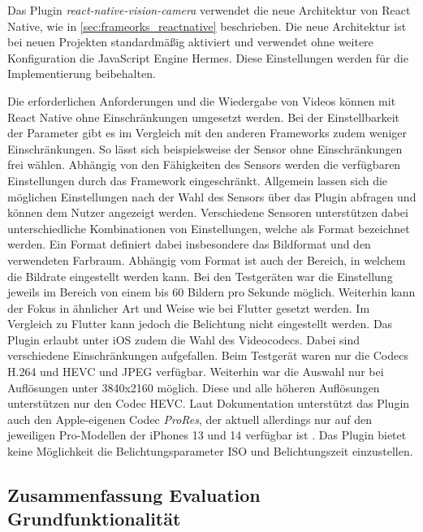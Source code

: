 Das Plugin \textit{react-native-vision-camera} verwendet die neue Architektur von React Native, wie in \autoref{sec:frameorks_reactnative} beschrieben.
Die neue Architektur ist bei neuen Projekten standardmäßig aktiviert und verwendet ohne weitere Konfiguration die JavaScript Engine Hermes.
Diese Einstellungen werden für die Implementierung beibehalten.

Die erforderlichen Anforderungen und die Wiedergabe von Videos können mit React Native ohne Einschränkungen umgesetzt werden.
Bei der Einstellbarkeit der Parameter gibt es im Vergleich mit den anderen Frameworks zudem weniger Einschränkungen.
So lässt sich beispielsweise der Sensor ohne Einschränkungen frei wählen.
Abhängig von den Fähigkeiten des Sensors werden die verfügbaren Einstellungen durch das Framework eingeschränkt.
Allgemein lassen sich die möglichen Einstellungen nach der Wahl des Sensors über das Plugin abfragen und können dem Nutzer angezeigt werden.
Verschiedene Sensoren unterstützen dabei unterschiedliche Kombinationen von Einstellungen, welche als Format bezeichnet werden.
Ein Format definiert dabei insbesondere das Bildformat und den verwendeten Farbraum.
Abhängig vom Format ist auch der Bereich, in welchem die Bildrate eingestellt werden kann.
Bei den Testgeräten war die Einstellung jeweils im Bereich von einem bis 60 Bildern pro Sekunde möglich.
Weiterhin kann der Fokus in ähnlicher Art und Weise wie bei Flutter gesetzt werden.
Im Vergleich zu Flutter kann jedoch die Belichtung nicht eingestellt werden.
Das Plugin erlaubt unter iOS zudem die Wahl des Videocodecs.
Dabei sind verschiedene Einschränkungen aufgefallen.
Beim Testgerät waren nur die Codecs H.264 und \ac{HEVC} und JPEG verfügbar.
Weiterhin war die Auswahl nur bei Auflösungen unter 3840x2160 möglich.
Diese und alle höheren Auflösungen unterstützen nur den Codec \ac{HEVC}.
Laut Dokumentation unterstützt das Plugin auch den Apple-eigenen Codec \textit{ProRes}, der aktuell allerdings nur auf den jeweiligen Pro-Modellen der iPhones 13 und 14 verfügbar ist \cite{Prores_iPhone13}.
Das Plugin bietet keine Möglichkeit die Belichtungsparameter ISO und Belichtungszeit einzustellen.

\subsection{Zusammenfassung Evaluation Grundfunktionalität}



